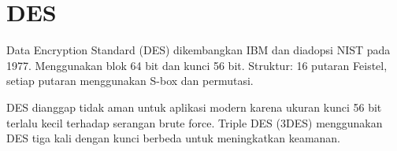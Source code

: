 \section{DES}

Data Encryption Standard (DES) dikembangkan IBM dan diadopsi NIST pada 1977. Menggunakan blok 64 bit dan kunci 56 bit. Struktur: 16 putaran Feistel, setiap putaran menggunakan S-box dan permutasi.

DES dianggap tidak aman untuk aplikasi modern karena ukuran kunci 56 bit terlalu kecil terhadap serangan brute force. Triple DES (3DES) menggunakan DES tiga kali dengan kunci berbeda untuk meningkatkan keamanan.
